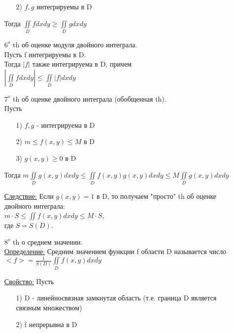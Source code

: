 \begin{enumerate}
\begin{enumerate}
	\item[2)]
	$f, g$ интегрируемы в D
	\end{enumerate}
	
Тогда $\iint\limits_{D} fdxdy \geqslant \iint\limits_{D} gdxdy$


\item[$6^o$] 
th об оценке модуля двойного интеграла. \\
Пусть f интегрируемы в D. \\
Тогда $|f|$ также интегрируема в D, причем \\
$\left| \iint\limits_{D} fdxdy \right| \leqslant \iint\limits_{D} \left|f\right| dxdy$


\item[$7^o$]
th об оценке двойного интеграла (обобщенная th). \\
Пусть
	\begin{enumerate}
	\item[1)] 
	$f,g$ - интегрируема в D
	
	\item[2)] 
	$m \leqslant f(x,y) \leqslant M$ в D
	
	\item[3)]
	$g(x,y) \geqslant 0$ в D
	\end{enumerate}
	
Тогда $m \iint\limits_{D} g(x,y) dxdy \leqslant \iint\limits_{D} f(x,y) g(x,y) dxdy \leqslant M \iint\limits_{D} g(x,y) dxdy$

\underline{Следствие:} Если $g(x,y) = 1$ в D, то получаем "просто" th об оценке двойного интеграла: \\
$m \cdot S \leqslant \iint f(x,y) dxdy \leqslant M \cdot S$, \\
где $S = S(D)$.


\item[$8^o$] 
th о среднем значении. \\
\underline{Определение:} Средним значением функции f области D называется число \\
$<f> = \frac{1}{S(D)} \iint\limits_{D} f(x,y) dxdy$

\underline{Свойство:} Пусть \\
	\begin{enumerate}
	\item[1)] 
	D - линейносвязная замкнутая область (т.е. граница D является связным множеством)
	
	\item[2)] 
	f непрерывна в D
	\end{enumerate}


\end{enumerate}
